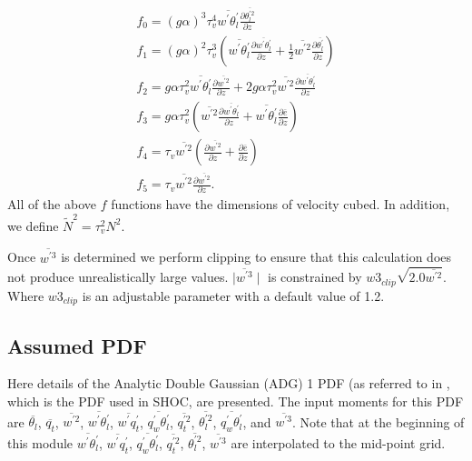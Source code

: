 %
\begin{equation}
  \label{f_functions}
  \begin{split}
  f_{0}=\left(g\alpha\right)^{3}\tau_{v}^{4}\overline{w^{'}\theta_{l}^{'}}\frac{\partial{\overline{\theta_{l}^{'2}}}}{\partial{z}}\\
  f_{1}=\left(g\alpha\right)^{2}\tau_{v}^{3}\left(\overline{w^{'}\theta_{l}^{'}}\frac{\partial{\overline{w^{'}\theta_{l}^{'}}}}{\partial{z}}+\frac{1}{2}\overline{w^{'2}}\frac{\partial{\overline{\theta_{l}^{'}}}}{\partial{z}}\right)\\
  f_{2}=g\alpha\tau_{v}^{2}\overline{w^{'}\theta_{l}^{'}}\frac{\partial{\overline{w^{'2}}}}{\partial{z}}+2g\alpha\tau_{v}^{2}\overline{w^{'2}}\frac{\partial{\overline{w^{'}\theta_{l}^{'}}}}{\partial{z}}\\
  f_{3}=g\alpha\tau_{v}^{2}\left(\overline{w^{'2}}\frac{\partial{\overline{w^{'}\theta_{l}^{'}}}}{\partial{z}}+\overline{w^{'}\theta_{l}^{'}}\frac{\partial{\overline{e}}}{\partial{z}}\right)\\
  f_{4}=\tau_{v}\overline{w^{'2}}\left(\frac{\partial{\overline{w^{'2}}}}{\partial{z}}+\frac{\partial{\overline{e}}}{\partial{z}}\right)\\
  f_{5}=\tau_{v}\overline{w^{'2}}\frac{\partial{\overline{w^{'2}}}}{\partial{z}}.
  \end{split}
\end{equation}
%
All of the above $f$ functions have the dimensions of velocity cubed.  In addition, we define $\tilde{N}^{2}=\tau_{v}^{2}N^{2}$.

Once $\overline{w^{'3}}$ is determined we perform clipping to ensure that this calculation does not produce unrealistically large values.  $\mid\overline{w^{'3}}\mid$ is constrained by $ w3_{clip} \sqrt{2.0 \overline{w^{'2}}} $.  Where $w3_{clip}$ is an adjustable parameter with a default value of 1.2.   

\subsection{Assumed PDF}
\label{assumed_pdf}
%
Here details of the Analytic Double Gaussian (ADG) 1 PDF (as referred to in \cite{Larson_et02}, which is the PDF used in SHOC, are presented.  The input moments for this PDF are $\overline{\theta_{l}}$, $\overline{q_{t}}$, $\overline{w^{'2}}$, $\overline{w^{'}\theta_{l}^{'}}$, $\overline{w^{'}q_{t}^{'}}$, $\overline{q_{w}^{'}\theta_{l}^{'}}$, $\overline{q_{t}^{'2}}$, $\overline{\theta_{l}^{'2}}$, $\overline{q_{w}^{'}\theta_{l}^{'}}$, and $\overline{w^{'3}}$.  Note that at the beginning of this module $\overline{w^{'}\theta_{l}^{'}}$, $\overline{w^{'}q_{t}^{'}}$, $\overline{q_{w}^{'}\theta_{l}^{'}}$, $\overline{q_{t}^{'2}}$, $\overline{\theta_{l}^{'2}}$, $\overline{w^{'3}}$ are interpolated to the mid-point grid.  

